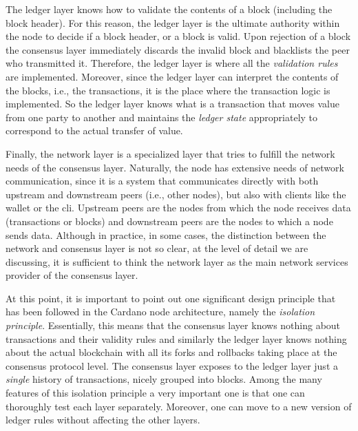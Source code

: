 The ledger layer knows how to validate the contents of a block (including the 
block 
header). For this reason, the ledger layer is the ultimate authority within the 
node to decide if a block header, or a block is valid. Upon rejection 
of 
a block the consensus layer immediately discards the invalid 
block and blacklists the peer who transmitted it. Therefore, the ledger layer 
is where all the \emph{validation rules} are implemented. Moreover, since the 
ledger layer can interpret the contents of the blocks, i.e., the transactions, 
it is the place where the transaction logic is implemented. So the ledger layer 
knows what is a transaction that moves value from one party to another and 
maintains the \emph{ledger state} appropriately to correspond to the actual 
transfer of value. 

Finally, the network layer is a specialized layer that tries to fulfill the 
network needs of the consensus layer. Naturally, the node has extensive needs 
of network communication, since it is a system that communicates directly with 
both upstream and downstream peers (i.e., other nodes), but also with clients 
like the wallet or the cli. Upstream peers are the nodes from which the 
node receives data (transactions or blocks) and downstream peers are the nodes 
to which a node sends data. Although in practice, in some cases, the 
distinction between the network and consensus layer is not so clear, at the 
level of detail we are discussing, it is sufficient to think the network layer 
as the main network services provider of the consensus layer.

At this point, it is important to point out one significant design principle 
that has been followed in the Cardano node architecture, namely the
\emph{isolation principle}. Essentially, this means that the consensus layer 
knows nothing about transactions and their validity rules and similarly the 
ledger layer knows nothing about the actual blockchain with all its
forks and rollbacks taking place at the consensus protocol level. The consensus 
layer exposes to the ledger layer just a \emph{single} history of transactions, 
nicely grouped into blocks. Among the many features of this isolation principle 
a very important one is that one can thoroughly test each layer separately. 
Moreover, one can move to a new version of ledger rules without affecting the 
other layers.  


